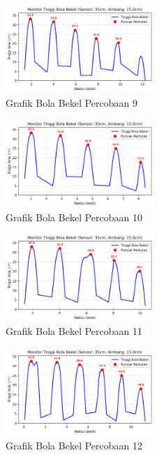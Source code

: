 \begin{figure}[htbp]
    \centering
    \includegraphics[width=0.5\textwidth]{chapters/DataPercobaan/Grafik_Bola_Bekel_9.png}
    \caption{Grafik Bola Bekel Percobaan 9}
\end{figure}
\begin{figure}[htbp]
    \centering
    \includegraphics[width=0.5\textwidth]{chapters/DataPercobaan/Grafik_Bola_Bekel_10.png}
    \caption{Grafik Bola Bekel Percobaan 10}
\end{figure}
\begin{figure}[htbp]
    \centering
    \includegraphics[width=0.5\textwidth]{chapters/DataPercobaan/Grafik_Bola_Bekel_11.png}
    \caption{Grafik Bola Bekel Percobaan 11}
\end{figure}
\begin{figure}[htbp]
    \centering
    \includegraphics[width=0.5\textwidth]{chapters/DataPercobaan/Grafik_Bola_Bekel_12.png}
    \caption{Grafik Bola Bekel Percobaan 12}
\end{figure}
